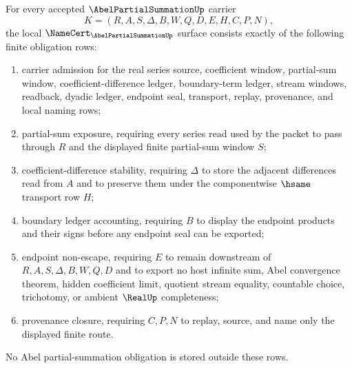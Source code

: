 \begin{theorem}
\label{thm:abel-partial-summation-namecert-obligations}
For every accepted $\AbelPartialSummationUp$ carrier
$$
K=(R,A,S,\Delta,B,W,Q,D,E,H,C,P,N),
$$
the local $\NameCert_{\AbelPartialSummationUp}$ surface consists exactly of the following finite obligation rows:
\begin{enumerate}
\item carrier admission for the real series source, coefficient window, partial-sum window, coefficient-difference ledger, boundary-term ledger, stream windows, readback, dyadic ledger, endpoint seal, transport, replay, provenance, and local naming rows;
\item partial-sum exposure, requiring every series read used by the packet to pass through $R$ and the displayed finite partial-sum window $S$;
\item coefficient-difference stability, requiring $\Delta$ to store the adjacent differences read from $A$ and to preserve them under the componentwise $\hsame$ transport row $H$;
\item boundary ledger accounting, requiring $B$ to display the endpoint products and their signs before any endpoint seal can be exported;
\item endpoint non-escape, requiring $E$ to remain downstream of $R,A,S,\Delta,B,W,Q,D$ and to export no host infinite sum, Abel convergence theorem, hidden coefficient limit, quotient stream equality, countable choice, trichotomy, or ambient $\RealUp$ completeness;
\item provenance closure, requiring $C,P,N$ to replay, source, and name only the displayed finite route.
\end{enumerate}
No Abel partial-summation obligation is stored outside these rows.
\end{theorem}

